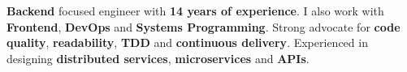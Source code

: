 \documentclass[10pt,a4paper,ragged2e,withhyper]{altacv}
\newcommand{\accentbold}[1]{\textbf{\textcolor{accent}{#1}}}
\begin{document}
\begin{paracol}{2}









\switchcolumn

%

%
%
%


\accentbold{Backend} focused engineer with \accentbold{14 years of experience}. I also work with \accentbold{Frontend}, \accentbold{DevOps} and \accentbold{Systems Programming}. Strong advocate for \accentbold{code quality}, \accentbold{readability}, \accentbold{TDD} and \accentbold{continuous delivery}. Experienced in designing \accentbold{distributed services}, \accentbold{microservices} and \accentbold{APIs}.


\end{paracol}
\end{document}
